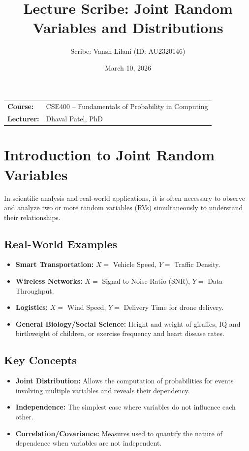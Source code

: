 \documentclass[11pt]{article}
\title{Lecture Scribe: Joint Random Variables and Distributions}
\author{Scribe: Vansh Lilani (ID: AU2320146)}
\date{March 10, 2026}
\begin{document}
\maketitle

\begin{tabular}{ll}
    \textbf{Course:} & CSE400 – Fundamentals of Probability in Computing \\
    \textbf{Lecturer:} & Dhaval Patel, PhD \\
\end{tabular}


\section{Introduction to Joint Random Variables}
In scientific analysis and real-world applications, it is often necessary to observe and analyze two or more random variables (RVs) simultaneously to understand their relationships.

\subsection*{Real-World Examples}
\begin{itemize}
    \item \textbf{Smart Transportation:} $X =$ Vehicle Speed, $Y =$ Traffic Density.
    \item \textbf{Wireless Networks:} $X =$ Signal-to-Noise Ratio (SNR), $Y =$ Data Throughput.
    \item \textbf{Logistics:} $X =$ Wind Speed, $Y =$ Delivery Time for drone delivery.
    \item \textbf{General Biology/Social Science:} Height and weight of giraffes, IQ and birthweight of children, or exercise frequency and heart disease rates.
\end{itemize}

\subsection*{Key Concepts}
\begin{itemize}
    \item \textbf{Joint Distribution:} Allows the computation of probabilities for events involving multiple variables and reveals their dependency.
    \item \textbf{Independence:} The simplest case where variables do not influence each other.
    \item \textbf{Correlation/Covariance:} Measures used to quantify the nature of dependence when variables are not independent.
\end{itemize}
\end{document}

